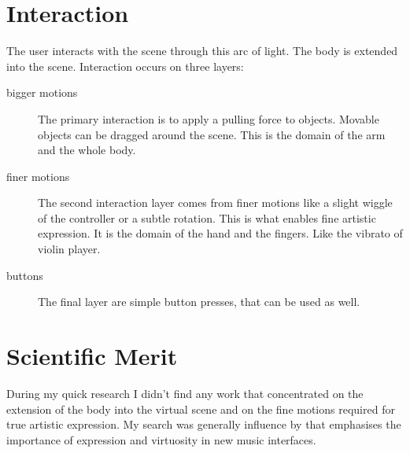 \documentclass[10pt,a4paper]{scrartcl}
\begin{document}
\section{Interaction}
The user interacts with the scene through this arc of light. The body is extended into the scene. Interaction occurs on three layers:

\begin{description}
\item[bigger motions] The primary interaction is to apply a pulling force to objects. Movable objects can be dragged around the scene. This is the domain of the arm and the whole body.

\item[finer motions] The second interaction layer comes from finer motions like a slight wiggle of the controller or a subtle rotation. This is what enables fine artistic expression. It is the domain of the hand and the fingers. Like the vibrato of violin player. 

\item[buttons] The final layer are simple button presses, that can be used as well.
\end{description}

\section{Scientific Merit}
During my quick research I didn't find any work that concentrated on the extension of the body into the virtual scene and on the fine motions required for true artistic expression. My search was generally influence by \cite{Dobrian2006} that emphasises the importance of expression and virtuosity in new music interfaces.



\end{document}
